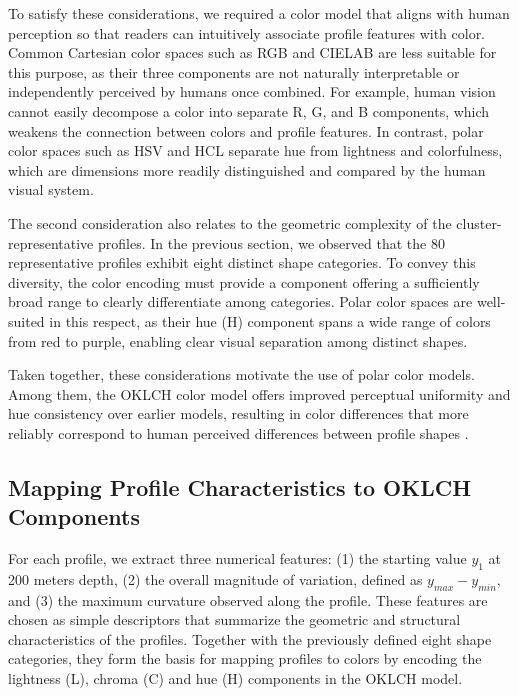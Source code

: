 \documentclass[11pt]{article}
\theoremstyle{plain}
\begin{document}
To satisfy these considerations, we required a color model that aligns with human perception so that readers can intuitively associate profile features with color. Common Cartesian color spaces such as RGB and CIELAB are less suitable for this purpose, as their three components are not naturally interpretable or independently perceived by humans once combined. For example, human vision cannot easily decompose a color into separate R, G, and B components, which weakens the connection between colors and profile features. In contrast, polar color spaces such as HSV and HCL separate hue from lightness and colorfulness, which are dimensions more readily distinguished and compared by the human visual system.

The second consideration also relates to the geometric complexity of the cluster-representative profiles. In the previous section, we observed that the 80 representative profiles exhibit eight distinct shape categories. To convey this diversity, the color encoding must provide a component offering a sufficiently broad range to clearly differentiate among categories. Polar color spaces are well-suited in this respect, as their hue (H) component spans a wide range of colors from red to purple, enabling clear visual separation among distinct shapes. 

Taken together, these considerations motivate the use of polar color models. Among them, the OKLCH color model offers improved perceptual uniformity and hue consistency over earlier models, resulting in color differences that more reliably correspond to human perceived differences between profile shapes \citep{ottosson2020oklab}.

\subsection{Mapping Profile Characteristics to OKLCH Components}
\label{sec:color_component}

For each profile, we extract three numerical features: (1) the starting value $y_1$ at 200 meters depth, (2) the overall magnitude of variation, defined as $y_{max} - y_{min}$, and (3) the maximum curvature observed along the profile. These features are chosen as simple descriptors that summarize the geometric and structural characteristics of the profiles. Together with the previously defined eight shape categories, they form the basis for mapping profiles to colors by encoding the lightness (L), chroma (C) and hue (H) components in the OKLCH model. 
\end{document}
